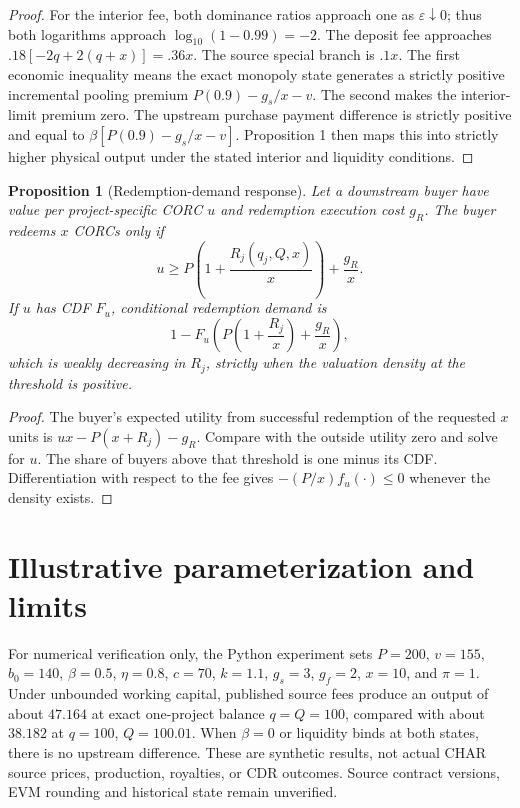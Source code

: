 \documentclass[11pt]{article}
\newtheorem{proposition}{Proposition}
\begin{document}
\begin{proof}
For the interior fee, both dominance ratios approach one as $\varepsilon\downarrow0$; thus both logarithms approach $\log_{10}(1-0.99)=-2$. The deposit fee approaches $.18[-2q+2(q+x)]=.36x$. The source special branch is $.1x$. The first economic inequality means the exact monopoly state generates a strictly positive incremental pooling premium $P(0.9)-g_s/x-v$. The second makes the interior-limit premium zero. The upstream purchase payment difference is strictly positive and equal to $\beta[P(0.9)-g_s/x-v]$. Proposition 1 then maps this into strictly higher physical output under the stated interior and liquidity conditions.
\end{proof}
\begin{proposition}[Redemption-demand response]
Let a downstream buyer have value per project-specific CORC $u$ and redemption execution cost $g_R$. The buyer redeems $x$ CORCs only if
\begin{equation}
 u\geq P\left(1+\frac{R_j(q_j,Q,x)}{x}\right)+\frac{g_R}{x}.
\end{equation}
If $u$ has CDF $F_u$, conditional redemption demand is
\begin{equation}
 1-F_u\left(P\left(1+\frac{R_j}{x}\right)+\frac{g_R}{x}\right),
\end{equation}
which is weakly decreasing in $R_j$, strictly when the valuation density at the threshold is positive.
\end{proposition}
\begin{proof}
The buyer's expected utility from successful redemption of the requested $x$ units is $ux-P(x+R_j)-g_R$. Compare with the outside utility zero and solve for $u$. The share of buyers above that threshold is one minus its CDF. Differentiation with respect to the fee gives $-(P/x)f_u(\cdot)\leq0$ whenever the density exists.
\end{proof}

\section{Illustrative parameterization and limits}
For numerical verification only, the Python experiment sets $P=200$, $v=155$, $b_0=140$, $\beta=0.5$, $\eta=0.8$, $c=70$, $k=1.1$, $g_s=3$, $g_f=2$, $x=10$, and $\pi=1$. Under unbounded working capital, published source fees produce an output of about $47.164$ at exact one-project balance $q=Q=100$, compared with about $38.182$ at $q=100$, $Q=100.01$. When $\beta=0$ or liquidity binds at both states, there is no upstream difference. These are synthetic results, not actual CHAR source prices, production, royalties, or CDR outcomes. Source contract versions, EVM rounding and historical state remain unverified.
\end{document}
